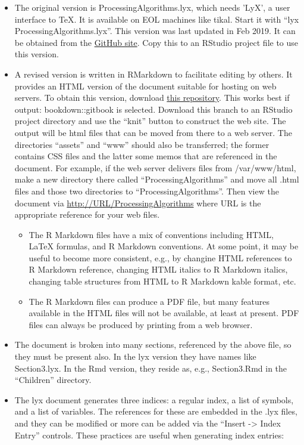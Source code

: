 \documentclass[
  english,
]{book}
\providecommand{\tightlist}{%
  \setlength{\itemsep}{0pt}\setlength{\parskip}{0pt}}
\begin{document}
\begin{itemize}
\tightlist
\item
  The original version is ProcessingAlgorithms.lyx, which needs 'LyX', a
  user interface to TeX. It is available on EOL machines like tikal.
  Start it with ``lyx ProcessingAlgorithms.lyx''. This version was last
  updated in Feb 2019. It can be obtained from the
  \href{https://github.com/WilliamCooper/ProcessingAlgorithms}{GitHub
  site}. Copy this to an RStudio project file to use this version.\\
\item
  A revised version is written in RMarkdown to facilitate editing by
  others. It provides an HTML version of the document suitable for
  hosting on web servers. To obtain this version, download
  \href{https://github.com/WilliamCooper/ProcessingAlgorithms/tree/Rmd}{this
  repository}. This works best if output: bookdown::gitbook is selected.
  Download this branch to an RStudio project directory and use the
  ``knit'' button to construct the web site. The output will be html
  files that can be moved from there to a web server. The directories
  ``assets'' and ``www'' should also be transferred; the former contains
  CSS files and the latter some memos that are referenced in the
  document. For example, if the web server delivers files from
  /var/www/html, make a new directory there called
  ``ProcessingAlgorithms'' and move all .html files and those two
  directories to ``ProcessingAlgorithms''. Then view the document via
  \url{http://URL/ProcessingAlgorithms} where URL is the appropriate
  reference for your web files.

  \begin{itemize}
  \tightlist
  \item
    The R Markdown files have a mix of conventions including HTML, LaTeX
    formulas, and R Markdown conventions. At some point, it may be
    useful to become more consistent, e.g., by changine HTML references
    to R Markdown reference, changing HTML italics to R Markdown
    italics, changing table structures from HTML to R Markdown kable
    format, etc.\\
  \item
    The R Markdown files can produce a PDF file, but many features
    available in the HTML files will not be available, at least at
    present. PDF files can always be produced by printing from a web
    browser.\\
  \end{itemize}
\item
  The document is broken into many sections, referenced by the above
  file, so they must be present also. In the lyx version they have names
  like Section3.lyx. In the Rmd version, they reside as, e.g.,
  Section3.Rmd in the ``Children'' directory.\\
\item
  The lyx document generates three indices: a regular index, a list of
  symbols, and a list of variables. The references for these are
  embedded in the .lyx files, and they can be modified or more can be
  added via the ``Insert -\textgreater{} Index Entry'' controls. These
  practices are useful when generating index entries:


\end{itemize}
\end{document}
